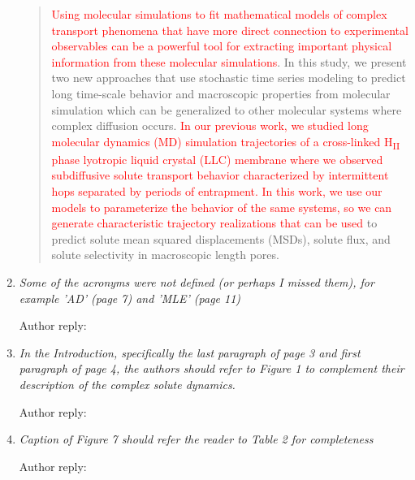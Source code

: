 \documentclass{article}
\begin{document}
\begin{enumerate}[label={Comment \theenumi :}, leftmargin=3.9\parindent]
	\begin{quote}
    \textcolor{red}{Using molecular simulations to fit mathematical models of complex transport phenomena
    that have more direct connection to experimental observables
    can be a powerful tool
    for extracting important physical information from these molecular simulations}. 
    In this study, we present two new approaches that use stochastic time series
    modeling to predict long time-scale behavior and macroscopic properties 
    from molecular simulation which can be generalized to other molecular systems
    where complex diffusion occurs. \textcolor{red}{In our previous work, we studied long 
    molecular dynamics (MD) simulation trajectories of a cross-linked 
    H\textsubscript{II} phase lyotropic liquid crystal (LLC) membrane where we
    observed subdiffusive solute transport behavior characterized by intermittent
    hops separated by periods of entrapment. In this work, we use our models to 
    parameterize the behavior of the same systems, so we can generate characteristic
    trajectory realizations that can be used} to predict solute mean squared 
    displacements (MSDs), solute flux, and solute selectivity in macroscopic length pores.
    \end{quote}
  
    \item \textit{Some of the acronyms were not defined (or perhaps I missed them), for example 'AD' 
    (page 7) and 'MLE' (page 11)}
    
    Author reply:

    \item \textit{In the Introduction, specifically the last paragraph of page 3 and first paragraph
    of page 4, the authors should refer to Figure 1 to complement their description of the complex solute
    dynamics.}
    
    Author reply:

    \item \textit{Caption of Figure 7 should refer the reader to Table 2 for completeness}
    
    Author reply:

\end{enumerate}

%
%
\end{document}
